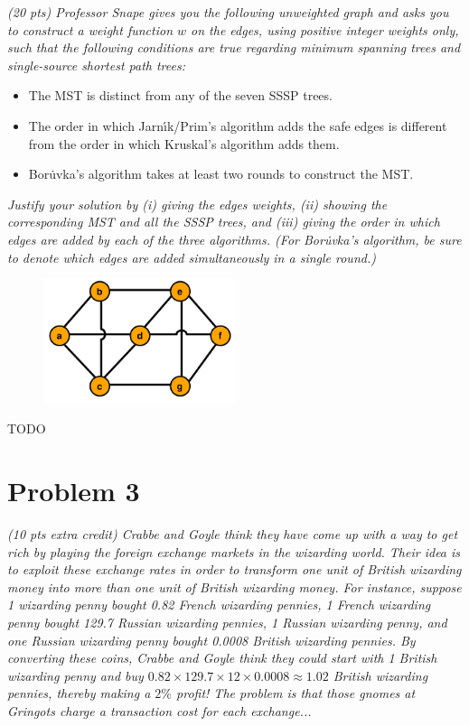 \documentclass[12pt]{article} \setlength{\oddsidemargin}{0in}
\begin{document}
\textit{(20 pts) Professor Snape gives you the following unweighted graph and asks you to
construct a weight function $w$ on the edges, using positive integer weights only, such
that the following conditions are true regarding minimum spanning trees and single-source shortest path trees:}
\begin{itemize}
\item The MST is distinct from any of the seven SSSP trees.
\item The order in which Jarnı́k/Prim’s algorithm adds the safe edges is different from the order in which Kruskal’s algorithm adds them.
\item Boru̇vka’s algorithm takes at least two rounds to construct the MST.
\end{itemize}

\textit{Justify your solution by (i) giving the edges weights, (ii) showing the corresponding
MST and all the SSSP trees, and (iii) giving the order in which edges are added by
each of the three algorithms. (For Boru̇vka’s algorithm, be sure to denote which edges
are added simultaneously in a single round.)}

\begin{figure}[h]
  \centering \includegraphics[width=0.5\textwidth]{P2}
\end{figure}


TODO

\newpage

\section*{Problem 3}

\textit{(10 pts extra credit) Crabbe and Goyle think they have come up with a way to get
rich by playing the foreign exchange markets in the wizarding world. Their idea is
to exploit these exchange rates in order to transform one unit of British wizarding
money into more than one unit of British wizarding money. For instance, suppose
1 wizarding penny bought 0.82 French wizarding pennies, 1 French wizarding penny
bought 129.7 Russian wizarding pennies, 1 Russian wizarding penny, and one Russian
wizarding penny bought 0.0008 British wizarding pennies. By converting these coins,
Crabbe and Goyle think they could start with 1 British wizarding penny and buy
$0.82 \times 129.7 \times 12 \times 0.0008 \approx 1.02$ British wizarding pennies, thereby making a $2\%$
profit! The problem is that those gnomes at Gringots charge a transaction cost for
each exchange...}
\end{document}
